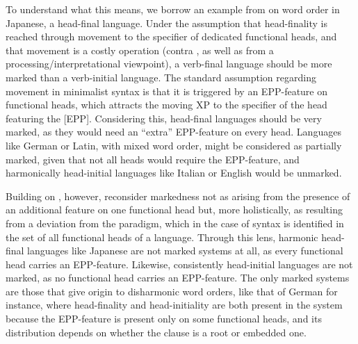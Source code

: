 \documentclass[output=paper]{langscibook}
\begin{document}
To understand what this means, we borrow an example from \citet{RobertsHolmberg2010} on word order in Japanese, a head-final language. Under the assumption that head-finality is reached through movement to the specifier of dedicated functional heads, and that movement is a costly operation (contra \citealt{Chomsky2013}, as well as from a processing\slash interpretational viewpoint), a verb-final language should be more marked than a verb-initial language. The standard assumption regarding movement in minimalist syntax is that it is triggered by an EPP-feature on functional heads, which attracts the moving XP to the specifier of the head featuring the [EPP]. Considering this, head-final languages should be very marked, as they would need an ``extra'' EPP-feature on every head. Languages like German or Latin, with mixed word order, might be considered as partially marked, given that not all heads would require the EPP-feature, and harmonically head-initial languages like Italian or English would be unmarked. 

Building on \citet{ChomskyHalle1968}, however, \citet{RobertsHolmberg2010} reconsider markedness not as arising from the presence of an additional feature on one functional head but, more holistically, as resulting from a deviation from the paradigm, which in the case of syntax is identified in the set of all functional heads of a language. Through this lens, harmonic head-final languages like Japanese are not marked systems at all, as every functional head carries an EPP-feature. Likewise, consistently head-initial languages are not marked, as no functional head carries an EPP-feature. The only marked systems are those that give origin to disharmonic word orders, like that of German for instance, where head-finality and head-initiality are both present in the system because the EPP-feature is present only on some functional heads, and its distribution depends on whether the clause is a root or embedded one. 
\end{document}
